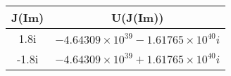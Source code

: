 \begin{table}[h!]
      \centering
      \begin{tabular}{||c c||} 
            \hline
            J(Im) & U(J(Im)) \\ [0.5ex] 
            \hline\hline
            1.8i & \(-4.64309 \times 10^{39} -1.61765  \times 10^{40} i\)  \\
            -1.8i & \(-4.64309 \times 10^{39} +1.61765  \times 10^{40} i\)  \\ [1ex] 
            \hline
      \end{tabular}
\end{table}
